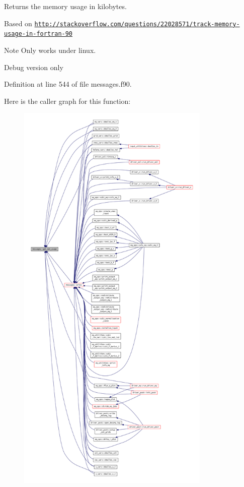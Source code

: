Returns the memory usage in kilobytes. 

Based on \href{http://stackoverflow.com/questions/22028571/track-memory-usage-in-fortran-90}{\tt http\+://stackoverflow.\+com/questions/22028571/track-\/memory-\/usage-\/in-\/fortran-\/90}

\begin{DoxyNote}{Note}
Only works under linux.

Debug version only 
\end{DoxyNote}


Definition at line 544 of file messages.\+f90.

Here is the caller graph for this function\+:
\nopagebreak
\begin{figure}[H]
\begin{center}
\leavevmode
\includegraphics[height=550pt]{namespacemessages_a82dddaab795b78b3d39e1ff1aab2f665_icgraph}
\end{center}
\end{figure}
\mbox{\label{namespacemessages_a5e45296f088e9f31115a3b8d869f3177}} 
